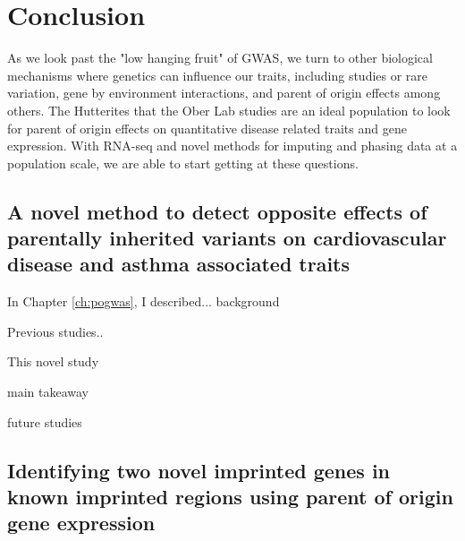 \chapter{Conclusion}

As we look past the "low hanging fruit" of GWAS, we turn to other biological mechanisms where genetics can influence our traits, including studies or rare variation\cite{Igartua:2017ir}, gene by environment interactions, and parent of origin effects among others. The Hutterites that the Ober Lab studies are an ideal population to look for parent of origin effects on quantitative disease related traits and gene expression\cite{Weiss:2005cq,Abney2001,Ober:2001dy}. With RNA-seq and novel methods for imputing and phasing data at a population scale\citep{Livne2015}, we are able to start getting at these questions. 

\section{A novel method to detect opposite effects of parentally inherited variants on cardiovascular disease and asthma associated traits}
 
 In Chapter \ref{ch:pogwas}, I described...  background
 
 
 Previous  studies.. 
 
 This novel study
 
main takeaway

future studies
 
\section{Identifying two novel imprinted genes in known imprinted regions using parent of origin gene expression}
